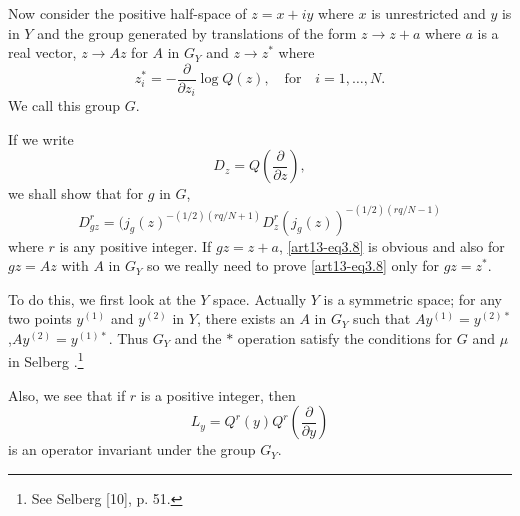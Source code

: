 Now consider the positive half-space of $z=x+iy$ where $x$ is unrestricted and $y$ is in $Y$ and the group generated by translations of the form $z\to z+a$ where $a$ is a real vector, $z\to Az$ for $A$ in $G_{Y}$ and $z\to z^{*}$ where
$$
z_{i}^{*}=-\dfrac{\partial}{\partial z_{i}}\log Q(z),\text{~~ for~~ } i=1,\ldots,N.
$$
We call this group $G$.

If we write
\begin{equation}
D_{z}=Q\left(\frac{\partial}{\partial z}\right),\label{art13-eq3.7}
\end{equation}
we shall show that for $g$ in $G$,
\begin{equation}
D^{r}_{gz}=(j_{g}(z)^{-(1/2)(rq/N+1)}D^{r}_{z}(j_{g}(z))^{-(1/2)(rq/N-1)}\label{art13-eq3.8}
\end{equation}
where $r$ is any positive integer. If $gz=z+a$, \eqref{art13-eq3.8} is obvious and also for $gz=Az$ with $A$ in $G_{Y}$ so we really need to prove \eqref{art13-eq3.8} only for $gz=z^{*}$.

To do this, we first look at the $Y$ space. Actually $Y$ is a symmetric space; for any two points $y^{(1)}$ and $y^{(2)}$ in $Y$, there exists an $A$ in $G_{Y}$ such that $Ay^{(1)}=y^{(2)*}$,\pageoriginale $Ay^{(2)}=y^{(1)*}$. Thus $G_{Y}$ and the $*$ operation satisfy the conditions for $G$ and $\mu$ in Selberg \cite{art13-key3}.\footnote[10]{See Selberg [10], p. 51.} 

Also, we see that if $r$ is a positive integer, then
\begin{equation}
L_{y}=Q^{r}(y)Q^{r}\left(\frac{\partial}{\partial y}\right)\label{art13-eq3.9}
\end{equation}
is an operator invariant under the group $G_{Y}$.

